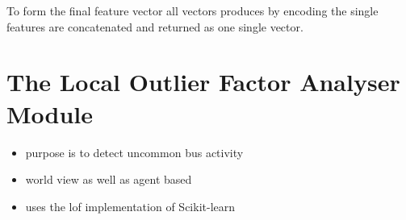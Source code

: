 To form the final feature vector all vectors produces by encoding the single features are concatenated and returned as one single vector.

\section{The Local Outlier Factor Analyser Module}
\label{sec:impl:lof}

\begin{itemize}
	\item purpose is to detect uncommon bus activity
	\item world view as well as agent based
	\item uses the \gls{lof} implementation of Scikit-learn \parencite{Pedregosa2011}
	

\end{itemize}
